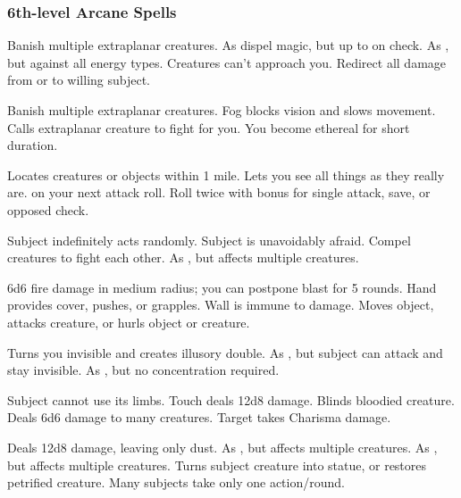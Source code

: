 \subsubsection{6th-level Arcane Spells} 
\begin{swspelllist}
   Banish multiple extraplanar creatures. 
   As dispel magic, but up to  on check.
   As , but against all energy types.
   Creatures can't approach you.
   Redirect all damage from or to willing subject.

   Banish multiple extraplanar creatures. 
   Fog blocks vision and slows movement.
   Calls extraplanar creature to fight for you.
   You become ethereal for short duration.

   Locates creatures or objects within 1 mile.
  \M Lets you see all things as they really are.
    on your next attack roll.
   Roll twice with bonus for single attack, save, or opposed check.

   Subject indefinitely acts randomly.
   Subject is unavoidably afraid.
   Compel creatures to fight each other.
   As , but affects multiple creatures.

   6d6 fire damage in medium radius; you can postpone blast for 5 rounds.
   Hand provides cover, pushes, or grapples.
   Wall is immune to damage.
   Moves object, attacks creature, or hurls object or creature.

   Turns you invisible and creates illusory double.
   As , but subject can attack and stay invisible.
   As , but no concentration required.

   Subject cannot use its limbs. 
   Touch deals 12d8 damage.
   Blinds bloodied creature.
   Deals 6d6 damage to many creatures.
   Target takes Charisma damage.

   Deals 12d8 damage, leaving only dust.
   As , but affects multiple creatures.
   As , but affects multiple creatures.
   Turns subject creature into statue, or restores petrified creature.
   Many subjects take only one action/round.
\end{swspelllist}

